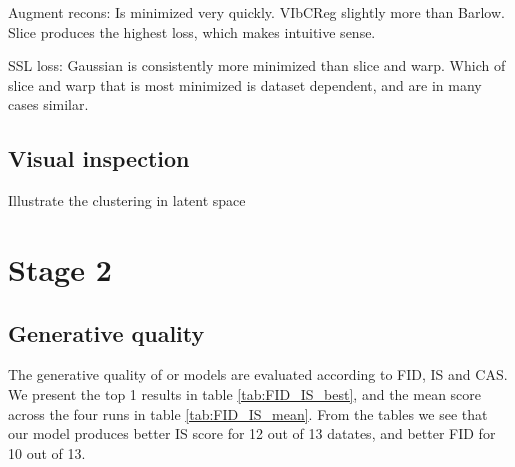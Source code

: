 \documentclass[../../thesis.tex]{subfiles}
\begin{document}
Augment recons: Is minimized very quickly. VIbCReg slightly more than Barlow. Slice produces the highest loss, which makes intuitive sense.\newline

SSL loss: Gaussian is consistently more minimized than slice and warp. Which of slice and warp that is most minimized is dataset dependent, and are in many cases similar.

\subsection{Visual inspection}



Illustrate the clustering in latent space


\section{Stage 2}

\subsection{Generative quality}

The generative quality of or models are evaluated according to FID, IS and CAS. We present the top 1 results in table \ref{tab:FID_IS_best}, and the mean score across the four runs in table \ref{tab:FID_IS_mean}. From the tables we see that our model produces better IS score for 12 out of 13 datates, and better FID for 10 out of 13.\newline
\end{document}
